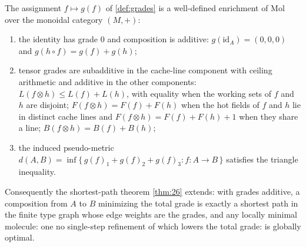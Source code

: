 \begin{theorem}\label{thm:53}
The assignment $f \mapsto g (f)$ of \autoref{def:grades} is a
well-defined enrichment of Mol over the monoidal category $(M, +)$:
\begin{enumerate}
\item[(i)] the identity has grade $0$ and composition is additive:
$g (\mathrm{id}_A) = (0,0,0)$ and $g (h \circ f) = g (f) + g (h)$;
\item[(ii)] tensor grades are subadditive in the cache-line component
with ceiling arithmetic and additive in the other components:
$L (f \otimes h) \le L (f) + L (h)$, with equality when the working sets of
$f$ and $h$ are disjoint; $F (f \otimes h) = F (f) + F (h)$ when the hot
fields of $f$ and $h$ lie in distinct cache lines and
$F (f \otimes h) = F (f) + F (h) + 1$ when they share a line;
$B (f \otimes h) = B (f) + B (h)$;
\item[(iii)] the induced pseudo-metric $d (A,B) = \inf\{\, g (f)_1 +
g (f)_2 + g (f)_3 : f \colon A \to B \,\}$ satisfies the triangle
inequality.
\end{enumerate}
Consequently the shortest-path theorem \ref{thm:26} extends: with grades
additive, a composition from $A$ to $B$ minimizing the total grade is
exactly a shortest path in the finite type graph whose edge weights are
the grades, and any locally minimal molecule: one no single-step
refinement of which lowers the total grade: is globally optimal.
\end{theorem}

